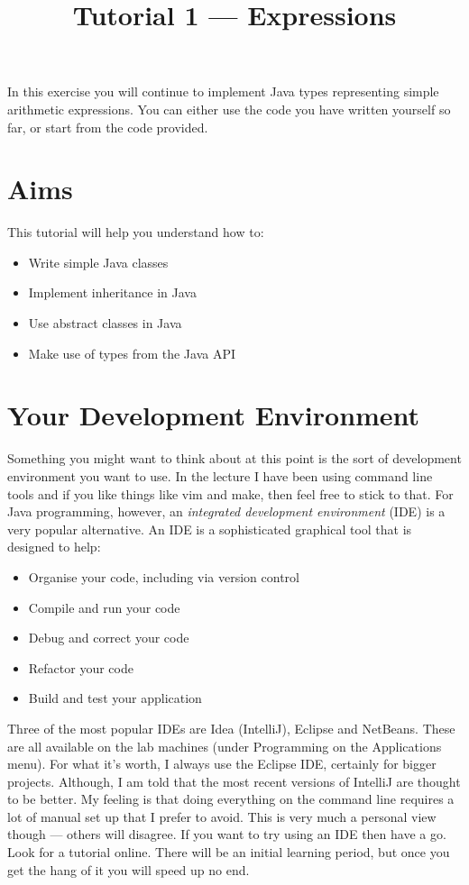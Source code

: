 \documentclass[11pt,a4paper]{article}
\title{Tutorial 1 --- Expressions}
\date{}
\begin{document}
 
\maketitle


In this exercise you will continue to implement Java types representing
simple arithmetic expressions.
You can either use the code you have written yourself so far,
or start from the code provided.

\section{Aims}

This tutorial will help you understand how to: 

\begin{itemize}
  \item Write simple Java classes
  \item Implement inheritance in Java
  \item Use abstract classes in Java
  \item Make use of types from the Java API
\end{itemize}

 
\section{Your Development Environment}
 
Something you might want to think about at this point is the sort of
development environment you want to use.
In the lecture I have been using command line tools and if you like things
like vim and make, then feel free to stick to that.
For Java programming, however,
an \emph{integrated development environment} (IDE) is a very popular 
alternative.
An IDE is a sophisticated graphical tool that is designed to help:

\begin{itemize}
  \item Organise your code, including via version control
  \item Compile and run your code
  \item Debug and correct your code
  \item Refactor your code
  \item Build and test your application
\end{itemize}

Three of the most popular IDEs are
Idea (IntelliJ), Eclipse and NetBeans.
These are all available on the lab machines
(under Programming on the Applications menu).
For what it's worth, 
I always use the Eclipse IDE, certainly for bigger projects.
Although, I am told that the most recent versions of IntelliJ are thought to be
better.
My feeling is that doing everything on the command line requires a lot of
manual set up that I prefer to avoid.
This is very much a personal view though --- others will disagree.
If you want to try using an IDE then have a go.
Look for a tutorial online.
There will be an initial learning period,
but once you get the hang of it you will speed up no end.
\end{document}
